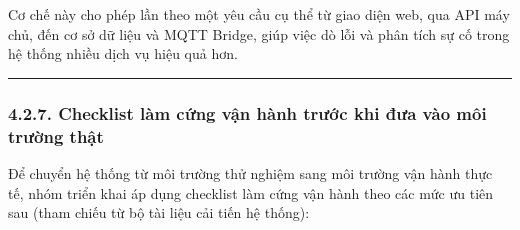 \documentclass[a4paper]{extarticle}
\begin{document}
Cơ chế này cho phép lần theo một yêu cầu cụ thể từ giao diện web, qua
API máy chủ, đến cơ sở dữ liệu và MQTT Bridge, giúp việc dò lỗi
và phân tích sự cố trong hệ thống nhiều dịch vụ hiệu quả hơn.

\begin{center}\rule{0.5\linewidth}{0.5pt}\end{center}

\subsubsection{4.2.7. Checklist làm cứng vận hành trước khi đưa vào môi
trường thật}\label{427-checklist-hardening-trux1b0ux1edbc-khi-vux1eadn-huxe0nh-production}

Để chuyển hệ thống từ môi trường thử nghiệm sang môi trường vận hành
thực tế, nhóm triển khai áp dụng checklist làm cứng vận hành theo các mức ưu
tiên sau (tham chiếu từ bộ tài liệu cải tiến hệ thống):
\end{document}
